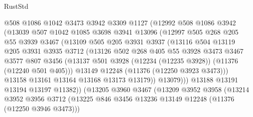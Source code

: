 \begin{lexlean}{RustStd}
\begin{coremodule}
{\begin{coremodule}
{{{{{{{{{{{{{{{{{{{{{{{{{{{{{{{{{{{{{{{{{{{{{{{{{{{{{{{{{{{{{{{{{{{{{{{{{{{{{{{{{{{{{                    @508
                    @1086
                    @1042
                    @3473
                    @3942
                    @3309
                    @1127
                    (@12992
                      @508
                      @1086
                      @3942
                      (@13039
                        @507
                        @1042
                        @1085
                        @3698
                        @3941
                        @13096
                        (@12997
                          @505
                          @268
                          @205
                          @55
                          @3939
                          @3467
                          (@13109
                            @505
                            @205
                            @3931
                            @3937
                            (@13116
                              @504
                              @13119
                              @205
                              @3931
                              @3935
                              @3712
                              (@13126
                                @502
                                @268
                                @405
                                @55
                                @3928
                                @3473
                                @3467
                                @3577
                                @807
                                @3456
                                (@13137
                                  @501
                                  @3928
                                  (@12234 (@12235 @3928))
                                  (@11376 (@12240 @501 @405)))
                                @13149
                                @12248
                                (@11376 (@12250 @3923 @3473)))
                              @13158
                              @13161
                              @13164
                              @13168
                              @13173
                              @13179))
                          @13079)))
                    @13188
                    @13191
                    @13194
                    @13197
                    @11382))
                (@13205
                  @3960
                  @3467
                  (@13209
                    @3952
                    @3958
                    (@13214
                      @3952
                      @3956
                      @3712
                      (@13225 @846 @3456 @13236 @13149 @12248 (@11376 (@12250 @3946 @3473)))
}}}}}}}}}}}}}}}}}}}}}}}}}}}}}}}}}}}}}}}}}}}}}}}}}}}}}}}}}}}}}}}}}}}}}}}}}}}}}}}}}}}}}
\end{coremodule}}
\end{coremodule}
\end{lexlean}
